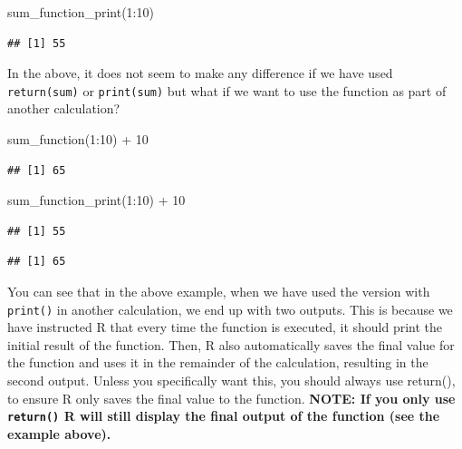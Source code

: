 \documentclass[
]{book}
\newenvironment{Shaded}{\begin{snugshade}}{\end{snugshade}}
\newcommand{\DecValTok}[1]{\textcolor[rgb]{0.00,0.00,0.81}{#1}}
\newcommand{\FunctionTok}[1]{\textcolor[rgb]{0.00,0.00,0.00}{#1}}
\newcommand{\NormalTok}[1]{#1}
\newcommand{\SpecialCharTok}[1]{\textcolor[rgb]{0.00,0.00,0.00}{#1}}
\theoremstyle{definition}
\theoremstyle{definition}
\theoremstyle{definition}
\theoremstyle{definition}
\theoremstyle{remark}
\begin{document}
\begin{Shaded}
\begin{Highlighting}[]
\FunctionTok{sum\_function\_print}\NormalTok{(}\DecValTok{1}\SpecialCharTok{:}\DecValTok{10}\NormalTok{)}
\end{Highlighting}
\end{Shaded}

\begin{verbatim}
## [1] 55
\end{verbatim}

In the above, it does not seem to make any difference if we have used \texttt{return(sum)} or \texttt{print(sum)} but what if we want to use the function as part of another calculation?

\begin{Shaded}
\begin{Highlighting}[]
\FunctionTok{sum\_function}\NormalTok{(}\DecValTok{1}\SpecialCharTok{:}\DecValTok{10}\NormalTok{) }\SpecialCharTok{+} \DecValTok{10}
\end{Highlighting}
\end{Shaded}

\begin{verbatim}
## [1] 65
\end{verbatim}

\begin{Shaded}
\begin{Highlighting}[]
\FunctionTok{sum\_function\_print}\NormalTok{(}\DecValTok{1}\SpecialCharTok{:}\DecValTok{10}\NormalTok{) }\SpecialCharTok{+} \DecValTok{10}
\end{Highlighting}
\end{Shaded}

\begin{verbatim}
## [1] 55
\end{verbatim}

\begin{verbatim}
## [1] 65
\end{verbatim}

You can see that in the above example, when we have used the version with \texttt{print()} in another calculation, we end up with two outputs. This is because we have instructed R that every time the function is executed, it should print the initial result of the function. Then, R also automatically saves the final value for the function and uses it in the remainder of the calculation, resulting in the second output. Unless you specifically want this, you should always use return(), to ensure R only saves the final value to the function. \textbf{NOTE: If you only use \texttt{return()} R will still display the final output of the function (see the example above).}
\end{document}
